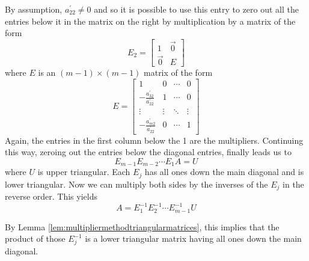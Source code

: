 \documentclass{ximera}
\begin{document}
By assumption, $a_{22}^{\prime }\neq 0$ and so it is possible to use this
entry to zero out all the entries below it in the matrix on the right by
multiplication by a matrix of the form 
\begin{equation*}
E_{2}=
\begin{bmatrix}
1 & \vec{0} \\
\vec{0} & E
\end{bmatrix}
\end{equation*}
where $E$ is an $( m-1)\times ( m-1)$
matrix of the form
\begin{equation*}
E=\begin{bmatrix}
1 & 0 & \cdots & 0 \\
-\frac{a_{32}^{\prime }}{a_{22}^{\prime }} & 1 & \cdots & 0 \\
\vdots & \vdots & \ddots & \vdots \\
-\frac{a_{m2}^{\prime }}{a_{22}^{\prime }} & 0 & \cdots & 1
\end{bmatrix}
\end{equation*}
Again, the entries in the first column below the 1 are the multipliers.
Continuing this way, zeroing out the entries below the diagonal entries, finally leads us to
\begin{equation*}
E_{m-1}E_{m-2}\cdots E_{1}A=U
\end{equation*}
where $U$ is upper triangular. Each $E_{j}$ has all ones down the main diagonal and is lower triangular. Now we can multiply both sides by the inverses of the $E_{j}$ in the reverse order. This yields
\begin{equation*}
A=E_{1}^{-1}E_{2}^{-1}\cdots E_{m-1}^{-1}U
\end{equation*}

By Lemma \ref{lem:multipliermethodtriangularmatrices}, this implies that the product of those $E_{j}^{-1}$
is a lower triangular matrix having all ones down the main diagonal.
\end{document}

